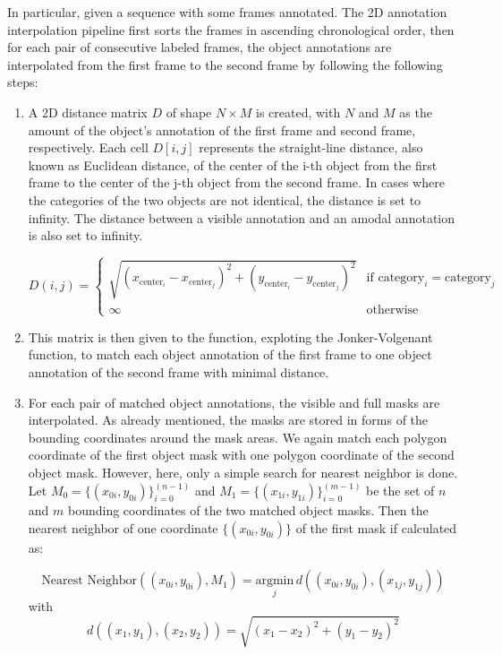 In particular, given a sequence with some frames annotated. The 2D annotation interpolation pipeline first sorts the frames in ascending chronological order, then for each pair of consecutive labeled frames, the object annotations are interpolated from the first frame to the second frame by following the following steps: 
\begin{enumerate}
	\item A 2D distance matrix $D$ of shape $N \times M$  is created, with $N$ and $M$ as the amount of the object's annotation of the first frame and second frame, respectively. Each cell $D[i,j]$ represents the straight-line distance, also known as Euclidean distance, of the center of the i-th object from the first frame to the center of the j-th object from the second frame. In cases where the categories of the two objects are not identical, the distance is set to infinity. The distance between a visible annotation and an amodal annotation is also set to infinity. 
	
	\[ D(i,j) = \begin{cases} 
		\sqrt{{(x_{\text{{center}}_i} - x_{\text{{center}}_j})^2 + (y_{\text{{center}}_i} - y_{\text{{center}}_j})^2}} & \text{if } \text{{category}}_i = \text{{category}}_j \\
		\infty & \text{otherwise}
	\end{cases} \]
	
	\item This matrix is then given to the  function, exploting  the Jonker-Volgenant function, to match each object annotation of the first frame to one object annotation of the second frame with minimal distance.
	
	\item For each pair of matched object annotations, the visible and full masks are interpolated. As already mentioned, the masks are stored in forms of the bounding coordinates around the mask areas. We again match each polygon coordinate of the first object mask with one polygon coordinate of the second object mask. However, here, only a simple search for nearest neighbor is done. Let \( M_0 = \{(x_{0i}, y_{0i})\}_{i=0}^(n-1) \) and \( M_1 = \{(x_{1i}, y_{1i})\}_{i=0}^(m-1) \) be the set of \( n \) and  \( m \) bounding coordinates of the two matched object masks. Then the nearest neighbor of one coordinate  \(\{(x_{0i}, y_{0i})\}\) of the first mask if calculated as: 
	
	\[ \text{Nearest Neighbor}((x_{0i}, y_{0i}), M_1) = \underset{j}{\text{argmin}} \, d((x_{0i}, y_{0i}), (x_{1j}, y_{1j})) \]  with 
	\[ d((x_1, y_1), (x_2, y_2)) = \sqrt{(x_1 - x_2)^2 + (y_1 - y_2)^2} \]
	

\end{enumerate}
